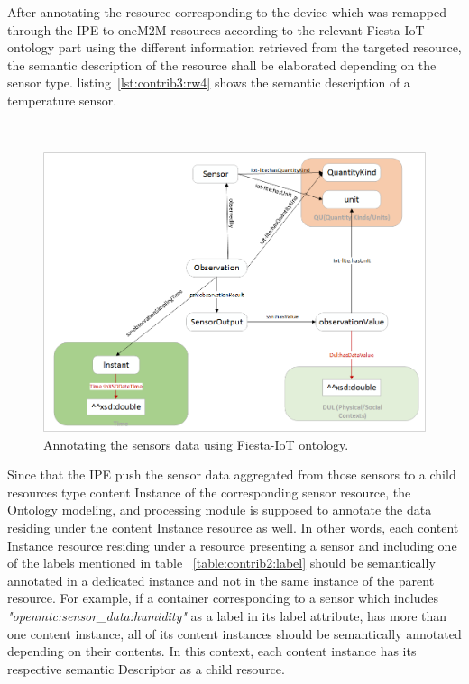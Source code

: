 After annotating the resource corresponding to the device which was remapped through the IPE to oneM2M resources according to the relevant Fiesta-IoT ontology part using the different information retrieved from the targeted resource, the semantic description of the resource shall be elaborated depending on the sensor type. listing~\ref{lst:contrib3:rw4} shows the semantic description of a temperature sensor.

\lstset{caption=the semantic description of the resource corresponding to a sensor, label=lst:contrib3:rw4,
language=xml, breaklines=true, numbers=left, basicstyle=\small\ttfamily,
stepnumber=1, frame=single, inputencoding=utf8/latin1}~


\begin{figure}[htbp]
    \centering
    \includegraphics[width=.9\textwidth]{resources/images/ci}
    \caption{Annotating the sensors data using Fiesta-IoT ontology. }\label{fig:contrib2:ci}
\end{figure}

Since that the IPE push the sensor data aggregated from those sensors to a child resources type content Instance of the corresponding sensor resource, the Ontology modeling, and processing module is supposed to annotate the data residing under the content Instance resource as well. In other words, each content Instance resource residing under a resource presenting a sensor and including one of the labels mentioned in table ~\ref{table:contrib2:label} should be semantically annotated in a dedicated instance and not in the same instance of the parent resource. For example, if a container corresponding to a sensor which includes \textit{"openmtc:sensor\_data:humidity"} as a label in its label attribute, has more than one content instance, all of its content instances should be semantically annotated depending on their contents. In this context, each content instance has its respective semantic Descriptor as a child resource.\par
 

